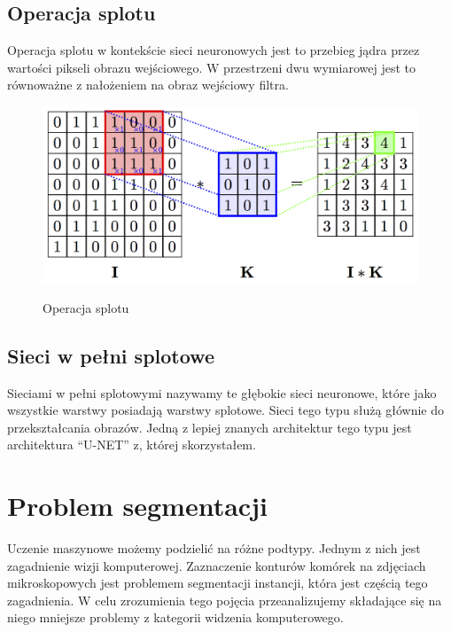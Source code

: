 \documentclass{article}
\begin{document}
\subsection{Operacja splotu}
Operacja splotu w kontekście sieci neuronowych jest to przebieg jądra przez wartości pikseli obrazu wejściowego.
W przestrzeni dwu wymiarowej jest to równoważne z nałożeniem na obraz wejściowy filtra.
\begin{figure}[H]
    \centering
    \includegraphics[width=\linewidth]{images/convolution.png}
    \caption{Operacja splotu}
    \cite{convolution}
\end{figure}
\subsection{Sieci w pełni splotowe}
Sieciami w pełni splotowymi nazywamy te głębokie sieci neuronowe, które jako wszystkie warstwy posiadają warstwy splotowe.
Sieci tego typu służą głównie do przekształcania obrazów.
Jedną z lepiej znanych architektur tego typu jest architektura ``U-NET'' z, której skorzystałem.
\newpage
\section{Problem segmentacji}
Uczenie maszynowe możemy podzielić na różne podtypy.
Jednym z nich jest zagadnienie wizji komputerowej.
Zaznaczenie konturów komórek na zdjęciach mikroskopowych jest problemem segmentacji instancji, która jest częścią tego zagadnienia.
W celu zrozumienia tego pojęcia przeanalizujemy składające się na niego mniejsze problemy z kategorii widzenia komputerowego.
\end{document}
